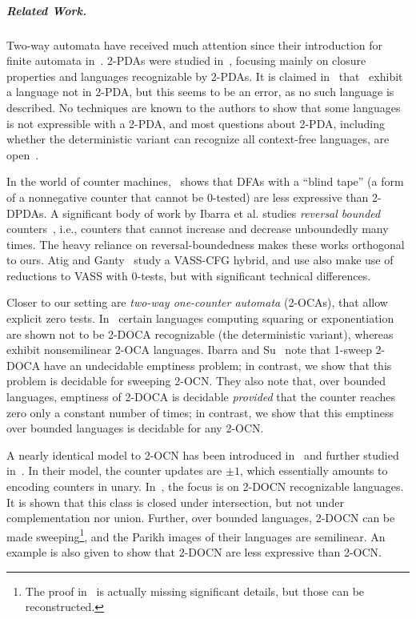 \documentclass[11pt,a4paper]{amsart}
\theoremstyle{definition}
\begin{document}
	\subparagraph*{Related Work.} Two-way automata have received much attention since
	their introduction for finite automata in~\cite{rabin1959finite}. 2-PDAs were
	studied
	in~\cite{martin1973two,gray1967two,arikawa1968some,monien1984deterministic},
	focusing mainly on closure properties and languages recognizable by 2-PDAs.  It
	is claimed in~\cite{arikawa1968some} that~\cite{gray1967two} exhibit a language
	not in 2-PDA, but this seems to be an error, as no such language is described.
	No techniques are known to the authors to show that some languages is not
	expressible with a 2-PDA, and most questions about 2-PDA, including whether the
	deterministic variant can recognize all context-free languages, are
	open~\cite{galil1976some}.
	
	In the world of counter machines,~\cite{duris1982fooling} shows that DFAs with a
	``blind tape'' (a form of a nonnegative counter that cannot be 0-tested) are
	less expressive than 2-DPDAs.  A significant body of work by Ibarra et
	al. studies \emph{reversal bounded}
	counters~\cite{ibarra1993equivalence,ibarra1999counter,ibarra2004two,dang2005two,ibarra1995new},
	i.e., counters that cannot increase and decrease unboundedly many times. The heavy reliance
	on reversal-boundedness makes these works orthogonal to ours. Atig and Ganty~\cite{atig2011approximating} study a VASS-CFG hybrid, and use also make use of reductions to VASS with 0-tests, but with significant technical differences.
	
	Closer to our setting are \emph{two-way one-counter automata} (2-OCAs), that
	allow explicit zero tests. In~\cite{petersen1994two} certain languages computing
	squaring or exponentiation are shown not to be 2-DOCA recognizable (the
	deterministic variant), whereas~\cite{de2014unary} exhibit nonsemilinear 2-OCA
	languages.  Ibarra and Su~\cite{ibarra1999counter} note that 1-sweep 2-DOCA have
	an undecidable emptiness problem; in contrast, we show that this problem is
	decidable for sweeping 2-OCN.  They also note that, over bounded languages,
	emptiness of 2-DOCA is decidable \emph{provided} that the counter reaches zero
	only a constant number of times; in contrast, we show that this emptiness over
	bounded languages is decidable for any 2-OCN. 
	
	A nearly identical model to 2-OCN has been introduced in~\cite{miyano1982two} and further studied in~\cite{chan1987two}. In their model, the counter updates are $\pm 1$, which essentially amounts to encoding counters in unary.
	In~\cite{miyano1982two}, the focus is on 2-DOCN recognizable languages. It is shown that this class is closed under intersection, but not under complementation nor union. Further, over bounded languages, 2-DOCN can be made sweeping\footnote{The proof in~\cite{miyano1982two} is actually missing significant details, but those can be reconstructed.}, and the Parikh images of their languages are semilinear. 
	An example is also given to show that 2-DOCN are less expressive than 2-OCN.
	
\end{document}
